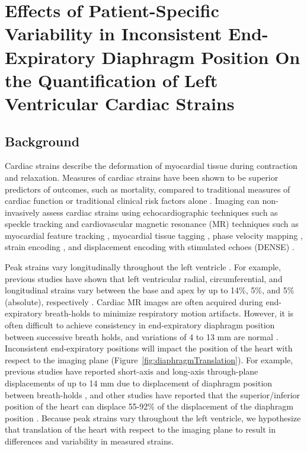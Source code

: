 \chapter{Effects of Patient-Specific Variability in Inconsistent End-Expiratory Diaphragm Position On the Quantification of Left Ventricular Cardiac Strains}

\section{Background}
	Cardiac strains describe the deformation of myocardial tissue during contraction and relaxation. Measures of cardiac strains have been shown to be superior predictors of outcomes, such as mortality, compared to traditional measures of cardiac function or traditional clinical risk factors alone \cite{Stanton2009}. Imaging can non-invasively assess cardiac strains using echocardiographic techniques such as speckle tracking \cite{Amundsen2006} and cardiovascular magnetic resonance (MR) techniques such as myocardial feature tracking \cite{Hor2010}, myocardial tissue tagging \cite{Axel1989,Zerhouni1988}, phase velocity mapping \cite{Pelc1994}, strain encoding \cite{Osman2001}, and displacement encoding with stimulated echoes (DENSE) \cite{Aletras1999b,Aletras1999c}.

	Peak strains vary longitudinally throughout the left ventricle \cite{Kuijer2002,Moore2000,Young1994a,Feng2009,NasiraeiMoghaddam2010,Donekal2013a,Suever2017}. For example, previous studies have shown that left ventricular radial, circumferential, and longitudinal strains vary between the base and apex by up to 14\%, 5\%, and 5\% (absolute), respectively \cite{Kuijer2002,Moore2000,Young1994a,Feng2009,NasiraeiMoghaddam2010,Donekal2013a,Suever2017}. Cardiac MR images are often acquired during end-expiratory breath-holds to minimize respiratory motion artifacts. However, it is often difficult to achieve consistency in end-expiratory diaphragm position between successive breath holds, and variations of 4 to 13 mm are normal \cite{Liu1993,Wang1995a,Taylor1997a,Holland1998c,Fischer2006a}. Inconsistent end-expiratory positions will impact the position of the heart with respect to the imaging plane (Figure~\ref{fig:diaphragmTranslation}). For example, previous studies have reported short-axis and long-axis through-plane displacements of up to 14 mm due to displacement of diaphragm position between breath-holds \cite{Slomka2007,Swingen2003}, and other studies have reported that the superior/inferior position of the heart can displace 55-92\% of the displacement of the diaphragm position \cite{Wang1995b,McLeish2002}. Because peak strains vary throughout the left ventricle, we hypothesize that translation of the heart with respect to the imaging plane to result in differences and variability in measured strains.

